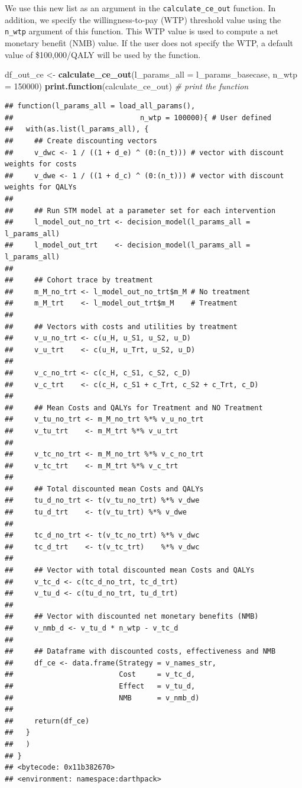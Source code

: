 \documentclass[]{book}
\newenvironment{Shaded}{\begin{snugshade}}{\end{snugshade}}
\newcommand{\KeywordTok}[1]{\textcolor[rgb]{0.13,0.29,0.53}{\textbf{#1}}}
\newcommand{\DataTypeTok}[1]{\textcolor[rgb]{0.13,0.29,0.53}{#1}}
\newcommand{\DecValTok}[1]{\textcolor[rgb]{0.00,0.00,0.81}{#1}}
\newcommand{\StringTok}[1]{\textcolor[rgb]{0.31,0.60,0.02}{#1}}
\newcommand{\CommentTok}[1]{\textcolor[rgb]{0.56,0.35,0.01}{\textit{#1}}}
\newcommand{\NormalTok}[1]{#1}
\begin{document}
We use this new list as an argument in the \texttt{calculate\_ce\_out}
function. In addition, we specify the willingness-to-pay (WTP) threshold
value using the \texttt{n\_wtp} argument of this function. This WTP
value is used to compute a net monetary benefit (NMB) value. If the user
does not specify the WTP, a default value of \$100,000/QALY will be used
by the function.

\begin{Shaded}
\begin{Highlighting}[]
\NormalTok{df_out_ce <-}\StringTok{ }\KeywordTok{calculate_ce_out}\NormalTok{(}\DataTypeTok{l_params_all =}\NormalTok{ l_params_basecase, }
                                \DataTypeTok{n_wtp =} \DecValTok{150000}\NormalTok{)}
\KeywordTok{print.function}\NormalTok{(calculate_ce_out) }\CommentTok{# print the function}
\end{Highlighting}
\end{Shaded}

\begin{verbatim}
## function(l_params_all = load_all_params(), 
##                              n_wtp = 100000){ # User defined
##   with(as.list(l_params_all), {
##     ## Create discounting vectors
##     v_dwc <- 1 / ((1 + d_e) ^ (0:(n_t))) # vector with discount weights for costs
##     v_dwe <- 1 / ((1 + d_c) ^ (0:(n_t))) # vector with discount weights for QALYs
##     
##     ## Run STM model at a parameter set for each intervention
##     l_model_out_no_trt <- decision_model(l_params_all = l_params_all)
##     l_model_out_trt    <- decision_model(l_params_all = l_params_all)
##     
##     ## Cohort trace by treatment
##     m_M_no_trt <- l_model_out_no_trt$m_M # No treatment
##     m_M_trt    <- l_model_out_trt$m_M    # Treatment
##     
##     ## Vectors with costs and utilities by treatment
##     v_u_no_trt <- c(u_H, u_S1, u_S2, u_D)
##     v_u_trt    <- c(u_H, u_Trt, u_S2, u_D)
##     
##     v_c_no_trt <- c(c_H, c_S1, c_S2, c_D)
##     v_c_trt    <- c(c_H, c_S1 + c_Trt, c_S2 + c_Trt, c_D)
##     
##     ## Mean Costs and QALYs for Treatment and NO Treatment
##     v_tu_no_trt <- m_M_no_trt %*% v_u_no_trt
##     v_tu_trt    <- m_M_trt %*% v_u_trt
##     
##     v_tc_no_trt <- m_M_no_trt %*% v_c_no_trt
##     v_tc_trt    <- m_M_trt %*% v_c_trt
##     
##     ## Total discounted mean Costs and QALYs
##     tu_d_no_trt <- t(v_tu_no_trt) %*% v_dwe 
##     tu_d_trt    <- t(v_tu_trt) %*% v_dwe
##     
##     tc_d_no_trt <- t(v_tc_no_trt) %*% v_dwc
##     tc_d_trt    <- t(v_tc_trt)    %*% v_dwc
##     
##     ## Vector with total discounted mean Costs and QALYs
##     v_tc_d <- c(tc_d_no_trt, tc_d_trt)
##     v_tu_d <- c(tu_d_no_trt, tu_d_trt)
##     
##     ## Vector with discounted net monetary benefits (NMB)
##     v_nmb_d <- v_tu_d * n_wtp - v_tc_d
##     
##     ## Dataframe with discounted costs, effectiveness and NMB
##     df_ce <- data.frame(Strategy = v_names_str,
##                         Cost     = v_tc_d,
##                         Effect   = v_tu_d,
##                         NMB      = v_nmb_d)
##     
##     return(df_ce)
##   }
##   )
## }
## <bytecode: 0x11b382670>
## <environment: namespace:darthpack>
\end{verbatim}
\end{document}
